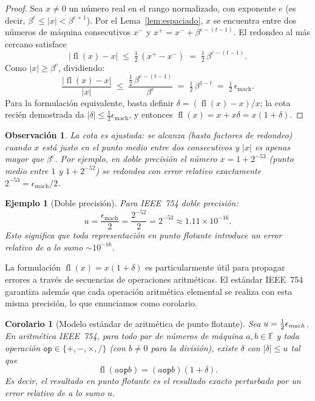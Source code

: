 \documentclass[a4paper,11pt]{report}
\newtheorem{corollary}[theorem]{Corolario}
\newtheorem{example}[theorem]{Ejemplo}
\newtheorem{remark}[theorem]{Observación}
\begin{document}
\begin{proof}
Sea $x\neq 0$ un número real en el rango normalizado, con exponente $e$ (es decir, $\beta^e \le |x| < \beta^{e+1}$).  Por el Lema~\ref{lem:espaciado}, $x$ se encuentra entre dos números de máquina consecutivos $x^-$ y $x^+ = x^- + \beta^{e-(t-1)}$.  El redondeo al más cercano satisface
\[
|\operatorname{fl}(x)-x| \;\le\; \tfrac{1}{2}\,(x^+-x^-) \;=\; \tfrac{1}{2}\,\beta^{e-(t-1)}.
\]
Como $|x|\ge\beta^e$, dividiendo:
\[
\frac{|\operatorname{fl}(x)-x|}{|x|} \;\le\; \frac{\tfrac{1}{2}\,\beta^{e-(t-1)}}{\beta^e} \;=\; \tfrac{1}{2}\,\beta^{1-t} \;=\; \tfrac{1}{2}\,\epsilon_{\text{mach}}.
\]
Para la formulación equivalente, basta definir $\delta = (\operatorname{fl}(x)-x)/x$; la cota recién demostrada da $|\delta|\le \tfrac{1}{2}\epsilon_{\text{mach}}$, y entonces $\operatorname{fl}(x) = x + x\delta = x(1+\delta)$.
\end{proof}

\begin{remark}
La cota es ajustada: se alcanza (hasta factores de redondeo) cuando $x$ está justo en el punto medio entre dos consecutivos y $|x|$ es apenas mayor que $\beta^e$.  Por ejemplo, en doble precisión el número $x=1+2^{-53}$ (punto medio entre $1$ y $1+2^{-52}$) se redondea con error relativo exactamente $2^{-53}=\epsilon_{\text{mach}}/2$.
\end{remark}

\begin{example}[Doble precisión]
Para IEEE~754 doble precisión:
\[
u = \frac{\epsilon_{\text{mach}}}{2} = \frac{2^{-52}}{2} = 2^{-53} \approx 1.11\times 10^{-16}.
\]
Esto significa que toda representación en punto flotante introduce un error relativo de a lo sumo $\sim 10^{-16}$.
\end{example}

La formulación $\operatorname{fl}(x)=x(1+\delta)$ es particularmente útil para propagar errores a través de secuencias de operaciones aritméticas.  El estándar IEEE~754 garantiza además que cada operación aritmética elemental se realiza con esta misma precisión, lo que enunciamos como corolario.

\begin{corollary}[Modelo estándar de aritmética de punto flotante]\label{cor:modelo_estandar}
Sea $u = \tfrac{1}{2}\epsilon_{\emph{mach}}$.  En aritmética IEEE~754, para todo par de números de máquina $a,b\in\mathbb{F}$ y toda operación $\texttt{op}\in\{+,-,\times,/\}$ (con $b\neq 0$ para la división), existe $\delta$ con $|\delta|\le u$ tal que
\[
\operatorname{fl}(a\mathbin{\texttt{op}} b) = (a\mathbin{\texttt{op}} b)(1+\delta).
\]
Es decir, el resultado en punto flotante es el resultado exacto perturbado por un error relativo de a lo sumo $u$.
\end{corollary}
\end{document}
